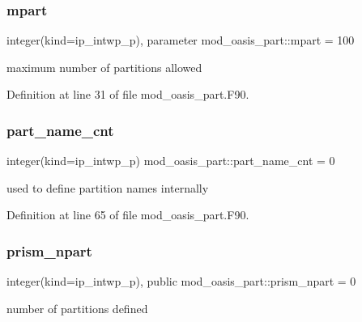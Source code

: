 \subsubsection{\texorpdfstring{mpart}{mpart}}
{\footnotesize\ttfamily integer(kind=ip\+\_\+intwp\+\_\+p), parameter mod\+\_\+oasis\+\_\+part\+::mpart = 100\hspace{0.3cm}{\ttfamily [private]}}



maximum number of partitions allowed 



Definition at line 31 of file mod\+\_\+oasis\+\_\+part.\+F90.

\mbox{\label{namespacemod__oasis__part_a8cee930f023feb7bcad4a0cab0b490a1}} 
\subsubsection{\texorpdfstring{part\+\_\+name\+\_\+cnt}{part\_name\_cnt}}
{\footnotesize\ttfamily integer(kind=ip\+\_\+intwp\+\_\+p) mod\+\_\+oasis\+\_\+part\+::part\+\_\+name\+\_\+cnt = 0\hspace{0.3cm}{\ttfamily [private]}}



used to define partition names internally 



Definition at line 65 of file mod\+\_\+oasis\+\_\+part.\+F90.

\mbox{\label{namespacemod__oasis__part_ac8340e63b159a9786ad8fffabd1d47f8}} 
\subsubsection{\texorpdfstring{prism\+\_\+npart}{prism\_npart}}
{\footnotesize\ttfamily integer(kind=ip\+\_\+intwp\+\_\+p), public mod\+\_\+oasis\+\_\+part\+::prism\+\_\+npart = 0}



number of partitions defined 



